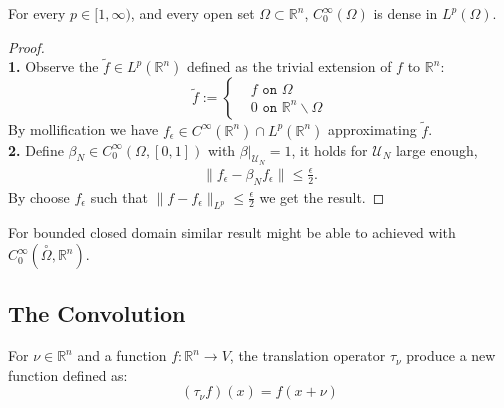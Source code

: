 \begin{corollary}
	For every $p \in [1, \infty)$, and every open set $\Omega \subset \mathbb{R}^n$, $C_0^\infty(\Omega)$ is dense in $L^p(\Omega)$. 
\end{corollary}
\begin{proof}
\quad\\
\textbf{1.} Observe the  $\tilde{f} \in L^p(\mathbb{R}^n)$ defined as the trivial extension of $f$ to $\mathbb{R}^n$: 
\begin{equation*}
\tilde{f}:=\left\{ 
\begin{aligned}
	& f \texttt{ on } \Omega\\
	& 0 \texttt{ on } \mathbb{R}^n \backslash\Omega
\end{aligned}
\right.
\end{equation*}
By mollification we have $f_\epsilon \in C^\infty(\mathbb{R}^n) \cap L^p(\mathbb{R}^n)$ approximating $\tilde{f}$. 
\quad\\
\textbf{2.} Define $\beta_N \in C^\infty_0( \Omega, [0, 1])$ with $\beta|_{\mathcal{U}_N} = 1$, it holds for $\mathcal{U}_N$ large enough, 
\begin{align*}
	\|f_\epsilon - \beta_N f_\epsilon \| \le \frac{\epsilon}{2}. 
\end{align*} 
By choose $f_\epsilon$ such that $\|f - f_\epsilon \|_{L^p} \le \frac{\epsilon}{2}$ we get the result. 
\end{proof}
\begin{remark}
For bounded closed domain similar result might be able to achieved with $C_0^\infty(\overset{\circ}{\Omega}, \mathbb{R}^n)$. 	
\end{remark}

\subsection{The Convolution}
\begin{definition}
	For $\nu \in \mathbb{R}^n$ and a function $f :\mathbb{R}^n \rightarrow V$, the translation operator $\tau_\nu$ produce a new function defined as:
	\begin{equation*}
		(\tau_\nu f) (x) = f(x + \nu)
	\end{equation*}
\end{definition}

